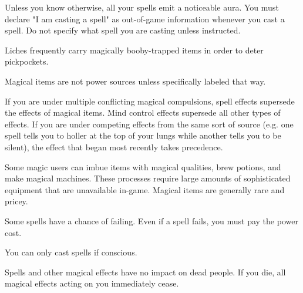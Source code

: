 \documentclass[green]{Sel}
\begin{document}
\name{\gMagic{}}
Unless you know otherwise, all your spells emit a noticeable aura. You must declare "I am casting a spell" as out-of-game information whenever you cast a spell. Do not specify what spell you are casting unless instructed.

Liches frequently carry magically booby-trapped items in order to deter pickpockets.

Magical items are not power sources unless specifically labeled that way.

If you are under multiple conflicting magical compulsions, spell effects supersede the effects of magical items. Mind control effects supersede all other types of effects. If you are under competing effects from the same sort of source (e.g. one spell tells you to holler at the top of your lungs while another tells you to be silent), the effect that began most recently takes precedence.

Some magic users can imbue items with magical qualities, brew potions, and make magical machines. These processes require large amounts of sophisticated equipment that are unavailable in-game. Magical items are generally rare and pricey.

Some spells have a chance of failing. Even if a spell fails, you must pay the power cost.

You can only cast spells if conscious.

Spells and other magical effects have no impact on dead people. If you die, all magical effects acting on you immediately cease.
\end{document}
